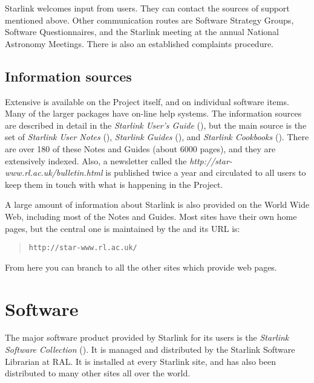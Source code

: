 {Starlink welcomes input from users.
They can contact the sources of support mentioned above.
Other communication routes are Software Strategy Groups, Software
Questionnaires, and the Starlink meeting at the annual National Astronomy
Meetings.
There is also an established complaints procedure.

\newpage

\subsection*{Information sources}

Extensive 
is available on the Project itself, and on individual software items.
Many of the larger packages have on-line help systems.
The information sources are described in detail in the {\em Starlink User's
Guide} (), but the main source is the set of
{\em Starlink User Notes}\/ (),
{\em Starlink Guides}\/ (),
and {\em Starlink Cookbooks}\/ ().
There are over 180 of these Notes and Guides (about 6000 pages), and they
are extensively indexed.
Also, a newsletter called the 
{\em {}
{http://star-www.rl.ac.uk/bulletin.html}} 
is published twice a year and circulated to all users to keep them in touch
with what is happening in the Project.

A large amount of information about Starlink is also provided on the World
Wide Web, including most of the Notes and Guides.
Most sites have their own home pages, but the central one is maintained
by the 
 and its URL is:
\begin{quote}
{\tt http://star-www.rl.ac.uk/}
\end{quote}
From here you can branch to all the other sites which provide web pages.

\newpage

\section*{Software}

The major software product provided by Starlink for its users is the
{\em Starlink Software Collection}\/ 
().
It is managed and distributed by the Starlink Software Librarian at RAL.
It is installed at every Starlink site, and has also been distributed to
many other sites all over the world.

}
